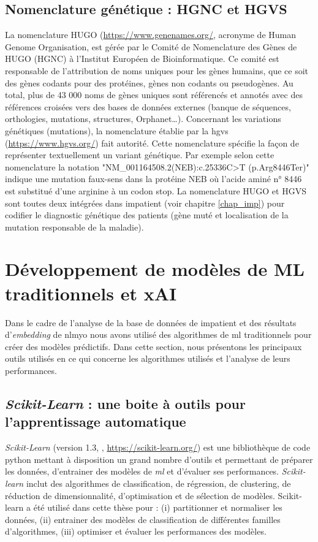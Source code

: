 \subsection{Nomenclature génétique : HGNC et HGVS}
La nomenclature HUGO (\url{https://www.genenames.org/}, acronyme de Human Genome Organisation, est gérée par le Comité de Nomenclature des Gènes de HUGO (HGNC) à l'Institut Européen de Bioinformatique. Ce comité est responsable de l'attribution de noms uniques pour les gènes humains, que ce soit des gènes codants pour des protéines, gènes non codants ou pseudogènes. Au total, plus de 43 000 noms de gènes uniques sont référencés et annotés avec des références croisées vers des bases de données externes (banque de séquences, orthologies, mutations, structures, Orphanet…). Concernant les variations génétiques (mutations), la nomenclature établie par la \gls{hgvs} (\url{https://www.hgvs.org/}) fait autorité. Cette nomenclature spécifie la façon de représenter textuellement un variant génétique. Par exemple selon cette nomenclature la notation "NM\_001164508.2(NEB):c.25336C>T (p.Arg8446Ter)" indique une mutation faux-sens dans la protéine NEB où l'acide aminé n° 8446 est substitué d'une arginine à un codon stop. La nomenclature HUGO et HGVS sont toutes deux intégrées dans \gls{impatient} (voir chapitre \ref{chap_imp}) pour codifier le diagnostic génétique des patients (gène muté et localisation de la mutation responsable de la maladie).

\section{Développement de modèles de ML traditionnels et xAI}
Dans le cadre de l'analyse de la base de données de \gls{impatient} et des résultats d'\textit{embedding} de \gls{nlmyo} nous avons utilisé des algorithmes de \gls{ml} traditionnels pour créer des modèles prédictifs. Dans cette section, nous présentons les principaux outils utilisés en ce qui concerne les algorithmes utilisés et l'analyse de leurs performances.

\subsection{\textit{Scikit-Learn} : une boite à outils pour l'apprentissage automatique}
\textit{Scikit-Learn} (version 1.3, \cite{pedregosa_scikit-learn_2011}, \url{https://scikit-learn.org/}) est une bibliothèque de code python mettant à disposition un grand nombre d'outils et permettant de préparer les données, d'entrainer des modèles de \textit{\gls{ml}} et d'évaluer ses performances. \textit{Scikit-learn} inclut des algorithmes de classification, de régression, de clustering, de réduction de dimensionnalité, d'optimisation et de sélection de modèles. Scikit-learn a été utilisé dans cette thèse pour : (i) partitionner et normaliser les données, (ii) entrainer des modèles de classification de différentes familles d'algorithmes, (iii) optimiser et évaluer les performances des modèles.

